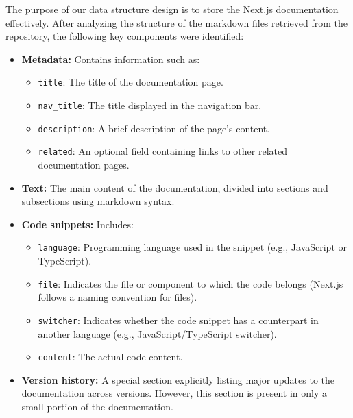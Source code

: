 The purpose of our data structure design is to store the Next.js documentation effectively. After analyzing the structure of the markdown files retrieved from the repository, the following key components were identified:

\begin{itemize}
	\item \textbf{Metadata:} Contains information such as:
	\begin{itemize}
		\item \texttt{title}: The title of the documentation page.
		\item \texttt{nav\_title}: The title displayed in the navigation bar.
		\item \texttt{description}: A brief description of the page's content.
		\item \texttt{related}: An optional field containing links to other related documentation pages.
	\end{itemize}
	
	\item \textbf{Text:} The main content of the documentation, divided into sections and subsections using markdown syntax.
	
	\item \textbf{Code snippets:} Includes:
	\begin{itemize}
		\item \texttt{language}: Programming language used in the snippet (e.g., JavaScript or TypeScript).
		\item \texttt{file}: Indicates the file or component to which the code belongs (Next.js follows a naming convention for files).
		\item \texttt{switcher}: Indicates whether the code snippet has a counterpart in another language (e.g., JavaScript/TypeScript switcher).
		\item \texttt{content}: The actual code content.
	\end{itemize}
	
	\item \textbf{Version history:} A special section explicitly listing major updates to the documentation across versions. However, this section is present in only a small portion of the documentation.
\end{itemize}

